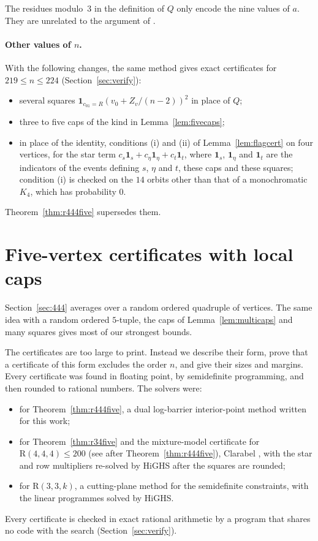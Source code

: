 \documentclass[11pt]{article}
\theoremstyle{spacedplain}
\theoremstyle{spaceddef}
\theoremstyle{spacedremark}
\newcommand{\R}{\mathrm{R}}
\begin{document}
The residues modulo~$3$ in the definition of $Q$ only encode the nine values of $a$.
They are unrelated to the argument of \cite{Boz26}.

\paragraph{Other values of $n$.}
With the following changes, the same method gives exact certificates for $219\le n\le 224$ (Section~\ref{sec:verify}):
\begin{itemize}
\item several squares $\mathbf 1_{c_{01}=R}(v_0+Z_v/(n-2))^2$ in place of $Q$;
\item three to five caps of the kind in Lemma~\ref{lem:fivecaps};
\item in place of the identity, conditions (i) and (ii) of Lemma~\ref{lem:flagcert} on four vertices, for the star term $c_s\mathbf 1_s+c_\eta\mathbf 1_\eta+c_t\mathbf 1_t$, where $\mathbf 1_s$, $\mathbf 1_\eta$ and $\mathbf 1_t$ are the indicators of the events defining $s$, $\eta$ and $t$, these caps and these squares;
condition (i) is checked on the $14$ orbits other than that of a monochromatic $K_4$, which has probability $0$.
\end{itemize}
Theorem~\ref{thm:r444five} supersedes them.

\section{Five-vertex certificates with local caps}\label{sec:five}

Section~\ref{sec:444} averages over a random ordered quadruple of vertices.
The same idea with a random ordered $5$-tuple, the caps of Lemma~\ref{lem:multicaps} and many squares gives most of our strongest bounds.

The certificates are too large to print.
Instead we describe their form, prove that a certificate of this form excludes the order $n$, and give their sizes and margins.
Every certificate was found in floating point, by semidefinite programming, and then rounded to rational numbers.
The solvers were:
\begin{itemize}
\item for Theorem~\ref{thm:r444five}, a dual log-barrier interior-point method written for this work;
\item for Theorem~\ref{thm:r34five} and the mixture-model certificate for $\R(4,4,4)\le 200$ (see after Theorem~\ref{thm:r444five}), Clarabel \cite{GC24}, with the star and row multipliers re-solved by HiGHS \cite{HH18} after the squares are rounded;

\item for $\R(3,3,k)$, a cutting-plane method for the semidefinite constraints, with the linear programmes solved by HiGHS.
\end{itemize}
Every certificate is checked in exact rational arithmetic by a program that shares no code with the search (Section~\ref{sec:verify}).
\end{document}
